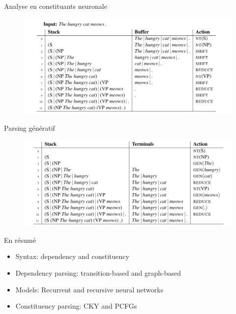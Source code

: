 \documentclass[
	hyperref={unicode},
	xcolor={svgnames, table},
	aspectratio=169,
	french,
]{beamer}
\begin{document}


\begin{frame}{Analyse en constituants neuronale}
	\begin{figure}
		\centering
		\includegraphics[scale=0.5]{images/rnng}
	\end{figure}

	\vfill
	\tiny{\textcite{dyer-etal-2016-recurrent}}
\end{frame}

\begin{frame}{Parsing génératif}
	\begin{figure}
		\centering
		\includegraphics[scale=0.5]{images/rnng_states.png}
	\end{figure}

	\vfill
	\tiny{\textcite{dyer-etal-2016-recurrent}}
\end{frame}

\begin{frame}{En résumé}
	\begin{block}{}
		\begin{itemize}
			\item Syntax: dependency and constituency
			\item Dependency parsing: transition-based and graph-based
			\item Models: Recurrent and recursive neural networks
			\item Constituency parsing: CKY and PCFGs
		\end{itemize}
	\end{block}
\end{frame}
\end{document}
